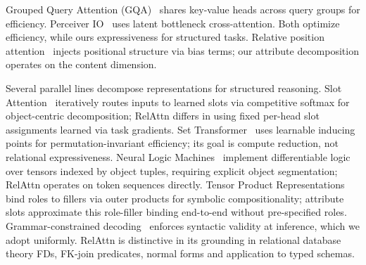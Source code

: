\documentclass[conference]{IEEEtran}
\begin{document}
Grouped Query Attention (GQA)~\cite{ainslie2023gqa} shares key-value heads across query groups for efficiency. Perceiver IO~\cite{jaegle2022perceiver} uses latent bottleneck cross-attention. Both optimize efficiency, while ours expressiveness for structured tasks. Relative position attention~\cite{shaw2018selfattention} injects positional structure via bias terms; our attribute decomposition operates on the content dimension.

Several parallel lines decompose representations for structured reasoning. {Slot Attention}~\cite{locatello2020object} iteratively routes inputs to learned slots via competitive softmax for object-centric decomposition; RelAttn differs in using fixed per-head slot assignments learned via task gradients. {Set Transformer}~\cite{lee2019set} uses learnable inducing points for permutation-invariant efficiency; its goal is compute reduction, not relational expressiveness. {Neural Logic Machines}~\cite{dong2019nlm} implement differentiable logic over tensors indexed by object tuples, requiring explicit object segmentation; RelAttn operates on token sequences directly. {Tensor Product Representations}~\cite{smolensky1990tensor} bind roles to fillers via outer products for symbolic compositionality; attribute slots approximate this role-filler binding end-to-end without pre-specified roles. Grammar-constrained decoding~\cite{scholak2021picard} enforces syntactic validity at inference, which we adopt uniformly. RelAttn is distinctive in its grounding in relational database theory FDs, FK-join predicates, normal forms and application to typed schemas.
\end{document}
